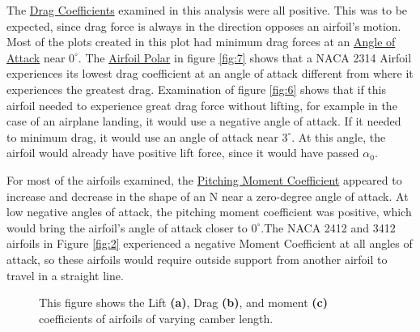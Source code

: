 \documentclass{article}
\begin{document}
The \hyperlink{CD}{Drag Coefficients} examined in this analysis were all positive. This was to be expected, since drag force is always in the direction opposes an airfoil's motion. Most of the plots created in this plot had minimum drag forces at an \hyperlink{alpha}{Angle of Attack} near $0^{\circ}$. The \hyperlink{AP}{Airfoil Polar} in figure \ref{fig:7} shows that a NACA 2314 Airfoil experiences its lowest drag coefficient at an angle of attack different from where it experiences the greatest drag. Examination of figure \ref{fig:6} shows that if this airfoil needed to experience great drag force without lifting, for example in the case of an airplane landing, it would use a negative angle of attack. If it needed to minimum drag, it would use an angle of attack near $3^{\circ}$. At this angle, the airfoil would already have positive lift force, since it would have passed $\alpha_{0}$. \newline

For most of the airfoils examined, the \hyperlink{CM}{Pitching Moment Coefficient} appeared to increase and decrease in the shape of an N near a zero-degree angle of attack. At low negative angles of attack, the pitching moment coefficient was positive, which would bring the airfoil's angle of attack closer to $0^{\circ}$.The NACA 2412 and 3412 airfoils in Figure \ref{fig:2} experienced a negative Moment Coefficient at all angles of attack, so these airfoils would require outside support from another airfoil to travel in a straight line.\newline

\begin{figure}
  \centering
  \caption{This figure shows the Lift \textbf{(a)}, Drag \textbf{(b)}, and moment \textbf{(c)} coefficients of airfoils of varying camber length.}
  \label{fig:1}
\end{figure}
\end{document}
